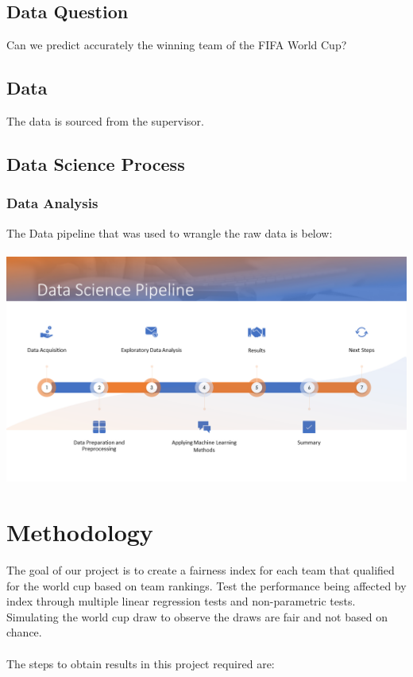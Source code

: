 \documentclass[11pt,a4paper]{scrartcl}
\begin{document}
\subsection{Data Question}

Can we predict accurately the winning team of the FIFA World Cup?

\subsection{Data}

The data is sourced from the supervisor.

\newpage

\subsection{Data Science Process}

\subsubsection{Data Analysis}

The Data pipeline that was used to wrangle the raw data is below:
\\ \\
\includegraphics[height=7.5cm,width=\linewidth]{datascipipeline.PNG}


\section{Methodology}


The goal of our project is to create a fairness index for each team that qualified for the world cup based on team rankings. Test the performance being affected by index through multiple linear regression tests and non-parametric tests. Simulating the world cup draw to observe the draws are fair and not based on chance.
\\ \\
The steps to obtain results in this project required are:
\end{document}

